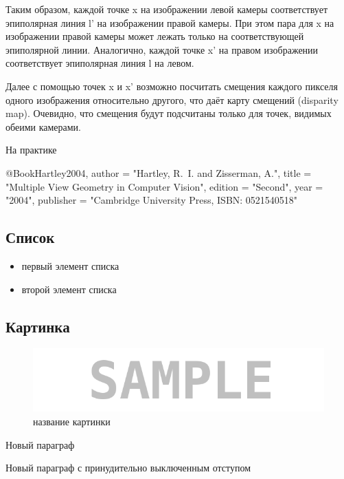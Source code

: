 Таким образом, каждой точке x на изображении левой камеры соответствует эпиполярная линия l' на изображении правой камеры. При этом пара для x на 
изображении правой камеры может лежать только на соответствующей эпиполярной линии. Аналогично, каждой точке x' на правом изображении соответствует 
эпиполярная линия l на левом.

Далее с помощью точек x и x' возможно посчитать смещения каждого пикселя одного изображения относительно другого, что даёт карту смещений (disparity map). 
Очевидно, что смещения будут подсчитаны только для точек, видимых обеими камерами. 

На практике 




@Book{Hartley2004,
    author = "Hartley, R.~I. and Zisserman, A.",
    title = "Multiple View Geometry in Computer Vision",
    edition = "Second",
    year = "2004",
    publisher = "Cambridge University Press, ISBN: 0521540518"
}

\subsection{Список}

\begin{itemize}
\item первый элемент списка
\item второй элемент списка
\end{itemize}


\subsection{Картинка}

\begin{figure}[H]
	\begin{center}
		\includegraphics[scale=0.7]{pics/sample}
		\caption{название картинки} 
		\label{pic:pic_name} %
	\end{center}
\end{figure}


Новый параграф

\noindent Новый параграф с принудительно выключенным отступом



